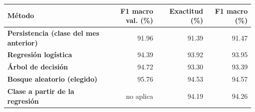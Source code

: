 \renewcommand{\arraystretch}{1.2}
\begin{tabular}{|>{\raggedright\arraybackslash}p{6.2cm}|r|r|r|}
\hline
\rowcolor{gray!20} \textbf{Método} & \textbf{F1 macro val. (\%)} & \textbf{Exactitud (\%)} & \textbf{F1 macro (\%)} \\
\hline
\textbf{Persistencia (clase del mes anterior)} & 91.96 & 91.39 & 91.47 \\
\hline
\textbf{Regresión logística} & 94.39 & 93.92 & 93.95 \\
\hline
\textbf{Árbol de decisión} & 94.72 & 93.30 & 93.39 \\
\hline
\textbf{Bosque aleatorio (elegido)} & 95.76 & 94.53 & 94.57 \\
\hline
\textbf{Clase a partir de la regresión} & no aplica & 94.19 & 94.26 \\
\hline
\end{tabular}
